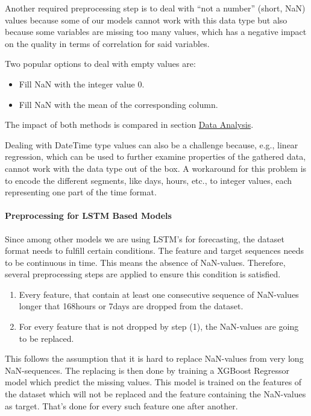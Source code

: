 \documentclass[a4paper]{article}
\providecommand{\tightlist}{%
      \setlength{\itemsep}{0pt}\setlength{\parskip}{0pt}}
\begin{document}
Another required preprocessing step is to deal with ``not a number''
(short, NaN) values because some of our models cannot work with this
data type but also because some variables are missing too many values,
which has a negative impact on the quality in terms of correlation for
said variables.

Two popular options to deal with empty values are:

    \begin{itemize}
\tightlist
\item
  Fill NaN with the integer value 0.
\item
  Fill NaN with the mean of the corresponding column.
\end{itemize}

The impact of both methods is compared in section
\hyperref[data-analysis]{Data Analysis}.

Dealing with DateTime type values can also be a challenge because, e.g.,
linear regression, which can be used to further examine properties of
the gathered data, cannot work with the data type out of the box. A
workaround for this problem is to encode the different segments, like
days, hours, etc., to integer values, each representing one part of the
time format.

    \paragraph{Preprocessing for LSTM Based
Models}\label{preprocessing-for-lstm-based-models}

    Since among other models we are using LSTM's for forecasting, the
dataset format needs to fulfill certain conditions. The feature and
target sequences needs to be continuous in time. This means the absence
of NaN-values. Therefore, several preprocessing steps are applied to
ensure this condition is satisfied.

\begin{enumerate}
\def\labelenumi{\arabic{enumi}.}
\tightlist
\item
  Every feature, that contain at least one consecutive sequence of
  NaN-values longer that 168hours or 7days are dropped from the dataset.
\item
  For every feature that is not dropped by step (1), the NaN-values are
  going to be replaced.
\end{enumerate}

This follows the assumption that it is hard to replace NaN-values from
very long NaN-sequences. The replacing is then done by training a
XGBoost Regressor model which predict the missing values. This model is
trained on the features of the dataset which will not be replaced and
the feature containing the NaN-values as target. That's done for every
such feature one after another.
\end{document}
